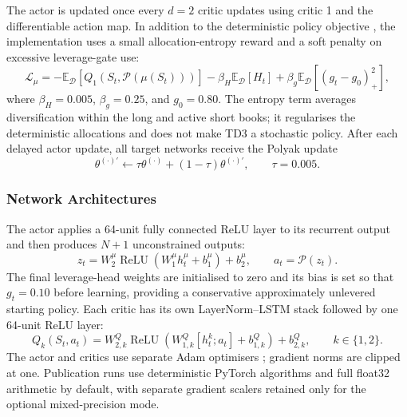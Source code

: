 The actor is updated once every $d=2$ critic updates using critic 1 and the differentiable action map. In addition to the deterministic policy objective \cite{silver_deterministic_2014}, the implementation uses a small allocation-entropy reward and a soft penalty on excessive leverage-gate use:
%
\begin{equation}
\mathcal{L}_{\mu}=-\mathbb{E}_{\mathcal{D}}[Q_1(S_t,\mathcal{P}(\mu(S_t)))]
-\beta_H\mathbb{E}_{\mathcal{D}}[H_t]
+\beta_g\mathbb{E}_{\mathcal{D}}[(g_t-g_0)_+^2],
\label{eq:actor_objective}
\end{equation}
%
where $\beta_H=0.005$, $\beta_g=0.25$, and $g_0=0.80$. The entropy term averages diversification within the long and active short books; it regularises the deterministic allocations and does not make TD3 a stochastic policy. After each delayed actor update, all target networks receive the Polyak update
%
\begin{equation}
\theta^{(\cdot)'}\leftarrow\tau\theta^{(\cdot)}+(1-\tau)\theta^{(\cdot)'},\qquad \tau=0.005.
\label{eq:soft_update}
\end{equation}

\subsubsection{Network Architectures}
\label{subsubsec:3_network_architectures}

The actor applies a 64-unit fully connected ReLU layer to its recurrent output and then produces $N+1$ unconstrained outputs:
%
\begin{equation}
z_t=W_2^\mu\operatorname{ReLU}(W_1^\mu h_t^\mu+b_1^\mu)+b_2^\mu,
\qquad a_t=\mathcal{P}(z_t).
\label{eq:actor_network}
\end{equation}
%
The final leverage-head weights are initialised to zero and its bias is set so that $g_t=0.10$ before learning, providing a conservative approximately unlevered starting policy. Each critic has its own LayerNorm--LSTM stack followed by one 64-unit ReLU layer:
%
\begin{equation}
Q_k(S_t,a_t)=W_{2,k}^Q\operatorname{ReLU}\!\left(W_{1,k}^Q[h_t^k;a_t]+b_{1,k}^Q\right)+b_{2,k}^Q,
\qquad k\in\{1,2\}.
\label{eq:critic_network}
\end{equation}
%
The actor and critics use separate Adam optimisers \cite{kingma_adam_2015}; gradient norms are clipped at one. Publication runs use deterministic PyTorch algorithms and full float32 arithmetic by default, with separate gradient scalers retained only for the optional mixed-precision mode.

